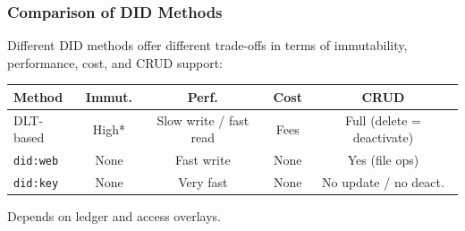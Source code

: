 \subsubsection {Comparison of DID Methods}

Different DID methods offer different trade-offs in terms of immutability, performance, cost, and CRUD support:

\begin{table}[h!]
\centering
\renewcommand{\arraystretch}{1.2}
\begin{tabular}{|l|c|c|c|c|}
\hline
\textbf{Method} & \textbf{Immut.} & \textbf{Perf.} & \textbf{Cost} & \textbf{CRUD} \\ \hline

DLT-based 
& High* 
& Slow write / fast read 
& Fees 
& Full (delete = deactivate) \\ \hline

\texttt{did:web} 
& None 
& Fast write 
& None 
& Yes (file ops) \\ \hline

\texttt{did:key} 
& None 
& Very fast 
& None 
& No update / no deact. \\ \hline

\end{tabular}

\smallskip
\raggedright
\footnotesize *Depends on ledger and access overlays.
\end{table}

